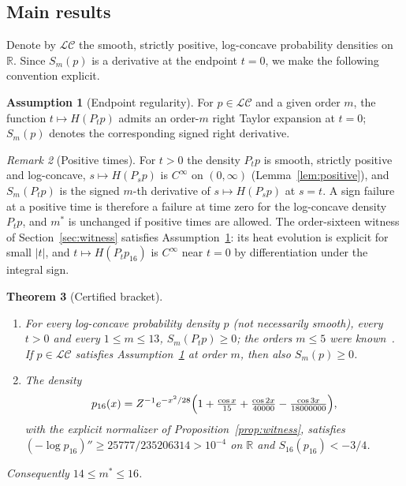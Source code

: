 \documentclass[11pt]{article}
\newtheorem{theorem}{Theorem}[section]
\theoremstyle{definition}
\newtheorem{assumption}[theorem]{Assumption}
\theoremstyle{remark}
\newtheorem{remark}[theorem]{Remark}
\newcommand{\R}{\mathbb R}
\begin{document}
\subsection{Main results}
Denote by $\mathcal{LC}$ the smooth, strictly positive, log-concave probability
densities on $\R$. Since $S_m(p)$ is a derivative at the endpoint $t=0$, we make the
following convention explicit.

\begin{assumption}[Endpoint regularity]\label{ass:endpoint}
For $p\in\mathcal{LC}$ and a given order $m$, the function $t\mapsto H(P_tp)$ admits
an order-$m$ right Taylor expansion at $t=0$; $S_m(p)$ denotes the corresponding
signed right derivative.
\end{assumption}

\begin{remark}[Positive times]\label{rem:positive-times}
For $t>0$ the density $P_tp$ is smooth, strictly positive and log-concave,
$s\mapsto H(P_sp)$ is $C^\infty$ on $(0,\infty)$ (Lemma~\ref{lem:positive}), and
$S_m(P_tp)$ is the signed $m$-th derivative of $s\mapsto H(P_sp)$ at $s=t$. A sign
failure at a positive time is therefore a failure at time zero for the log-concave
density $P_tp$, and $m^*$ is unchanged if positive times are allowed. The
order-sixteen witness of Section~\ref{sec:witness} satisfies
Assumption~\ref{ass:endpoint}: its heat evolution is explicit for small $|t|$, and
$t\mapsto H(P_tp_{16})$ is $C^\infty$ near $t=0$ by differentiation under the
integral sign.
\end{remark}

\begin{theorem}[Certified bracket]\label{thm:main}
\begin{enumerate}[label=(\roman*)]
\item For every log-concave probability density $p$ (not necessarily smooth), every
 $t>0$ and every $1\le m\le13$, $S_m(P_tp)\ge0$; the orders $m\le5$ were
 known~\cite{ZAG18,Wang24}. If $p\in\mathcal{LC}$ satisfies
 Assumption~\ref{ass:endpoint} at order $m$, then also $S_m(p)\ge0$.
\item The density
 \[
 p_{16}(x)=Z^{-1}e^{-x^2/28}\Bigl(1+\tfrac{\cos x}{15}+\tfrac{\cos2x}{40000}
 -\tfrac{\cos3x}{18000000}\Bigr),
 \]
 with the explicit normalizer of Proposition~\ref{prop:witness}, satisfies
 $(-\log p_{16})''\ge 25777/235206314>10^{-4}$ on $\R$ and $S_{16}(p_{16})<-3/4$.
\end{enumerate}
Consequently $14\le m^*\le16$.
\end{theorem}
\end{document}
